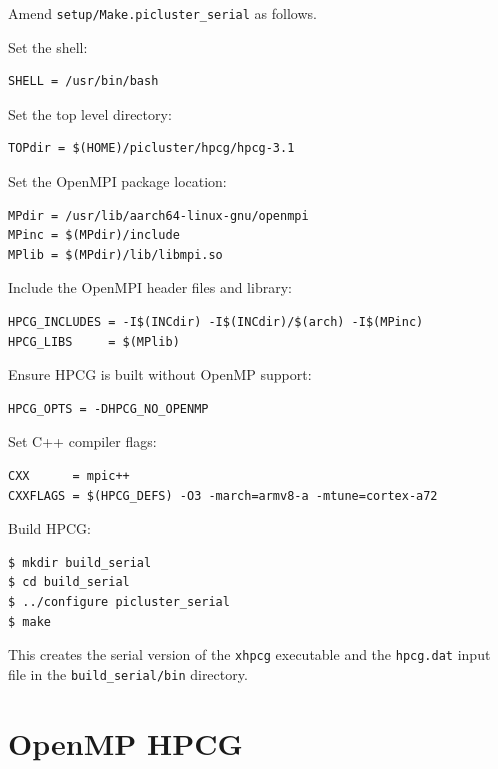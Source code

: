 \documentclass{report}
\begin{document}
Amend \verb|setup/Make.picluster_serial| as follows.

Set the shell:

\lstset{style=listing}
\begin{lstlisting}[numbers=none]
SHELL = /usr/bin/bash
\end{lstlisting}

Set the top level directory:

\lstset{style=listing}
\begin{lstlisting}[numbers=none]
TOPdir = $(HOME)/picluster/hpcg/hpcg-3.1
\end{lstlisting}

Set the OpenMPI package location:

\lstset{style=listing}
\begin{lstlisting}[numbers=none]
MPdir = /usr/lib/aarch64-linux-gnu/openmpi
MPinc = $(MPdir)/include
MPlib = $(MPdir)/lib/libmpi.so
\end{lstlisting}

Include the OpenMPI header files and library:

\lstset{style=listing}
\begin{lstlisting}[numbers=none]
HPCG_INCLUDES = -I$(INCdir) -I$(INCdir)/$(arch) -I$(MPinc)
HPCG_LIBS     = $(MPlib)
\end{lstlisting}

Ensure HPCG is built without OpenMP support:

\lstset{style=listing}
\begin{lstlisting}[numbers=none]
HPCG_OPTS = -DHPCG_NO_OPENMP
\end{lstlisting}

Set C++ compiler flags:

\lstset{style=listing}
\begin{lstlisting}[numbers=none]
CXX      = mpic++
CXXFLAGS = $(HPCG_DEFS) -O3 -march=armv8-a -mtune=cortex-a72
\end{lstlisting}

Build HPCG:

\lstset{style=type}
\begin{lstlisting}[numbers=none]
$ mkdir build_serial
$ cd build_serial
$ ../configure picluster_serial
$ make
\end{lstlisting}

This creates the serial version of the \verb|xhpcg| executable and the \verb|hpcg.dat| input file in the \verb|build_serial/bin| directory.


%
%
\section{OpenMP HPCG}
\end{document}
